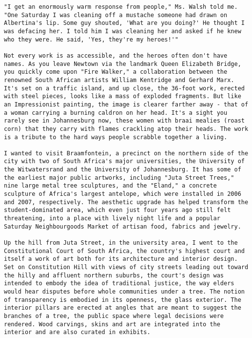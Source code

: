 \begin{lstlisting}
"I get an enormously warm response from people," Ms. Walsh told me. "One Saturday I was cleaning off a mustache someone had drawn on Albertina's lip. Some guy shouted, 'What are you doing?' He thought I was defacing her. I told him I was cleaning her and asked if he knew who they were. He said, 'Yes, they're my heroes!'"

Not every work is as accessible, and the heroes often don't have names. As you leave Newtown via the landmark Queen Elizabeth Bridge, you quickly come upon "Fire Walker," a collaboration between the renowned South African artists William Kentridge and Gerhard Marx. It's set on a traffic island, and up close, the 36-foot work, erected with steel pieces, looks like a mass of exploded fragments. But like an Impressionist painting, the image is clearer farther away - that of a woman carrying a burning caldron on her head. It's a sight you rarely see in Johannesburg now, these women with braai mealies (roast corn) that they carry with flames crackling atop their heads. The work is a tribute to the hard ways people scrabble together a living.

I wanted to visit Braamfontein, a precinct on the northern side of the city with two of South Africa's major universities, the University of the Witwatersrand and the University of Johannesburg. It has some of the earliest major public artworks, including "Juta Street Trees," nine large metal tree sculptures, and the "Eland," a concrete sculpture of Africa's largest antelope, which were installed in 2006 and 2007, respectively. The aesthetic upgrade has helped transform the student-dominated area, which even just four years ago still felt threatening, into a place with lively night life and a popular Saturday Neighbourgoods Market of artisan food, fabrics and jewelry.

Up the hill from Juta Street, in the university area, I went to the Constitutional Court of South Africa, the country's highest court and itself a work of art both for its architecture and interior design. Set on Constitution Hill with views of city streets leading out toward the hilly and affluent northern suburbs, the court's design was intended to embody the idea of traditional justice, the way elders would hear disputes before whole communities under a tree. The notion of transparency is embodied in its openness, the glass exterior. The interior pillars are erected at angles that are meant to suggest the branches of a tree, the public space where legal decisions were rendered. Wood carvings, skins and art are integrated into the interior and are also curated in exhibits.


\end{lstlisting}
